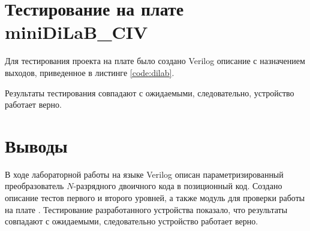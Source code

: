 \section{Тестирование на плате miniDiLaB\_CIV}

Для тестирования проекта на плате было создано Verilog описание с назначением выходов, приведенное в листинге  \ref{code:dilab}.


Результаты тестирования совпадают с ожидаемыми, следовательно, устройство работает верно.
 
\section{Выводы}

В ходе лабораторной работы на языке Verilog описан параметризированный преобразователь $N$-разрядного двоичного кода в позиционный код. Создано описание тестов первого и второго уровней, а также модуль для проверки работы на плате . Тестирование разработанного устройства показало, что результаты совпадают с ожидаемыми, следовательно устройство работает верно.

